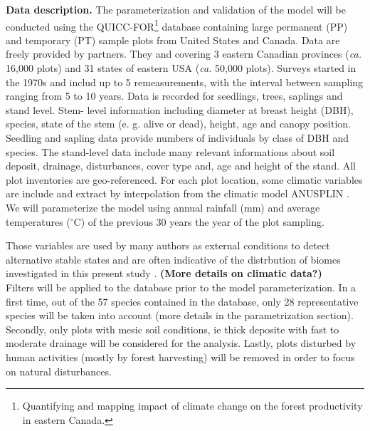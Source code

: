 \textbf{Data description.} The parameterization and validation of the model
will be conducted using the QUICC-FOR\footnote{Quantifying and mapping impact
of climate change on the forest productivity in eastern Canada.} database
containing large permanent (PP) and temporary (PT) sample plots from
United States and Canada. Data are freely provided by partners. They and
covering 3 eastern Canadian provinces (\textit{ca.} 16,000 plots) and 31 states of
eastern USA (\textit{ca.} 50,000 plots). Surveys started in the 1970s and includ up to
5 remeasurements, with the interval between sampling ranging from 5 to 10
years. Data is recorded for seedlings, trees, saplings and stand level. Stem-
level information including diameter at breast height (DBH), species, state of
the stem (e. g. alive or dead), height, age and canopy position. Seedling and
sapling data provide numbers of individuals by class of DBH and species. The
stand-level data include many relevant informations about soil deposit,
drainage, disturbances, cover type and, age and height of the stand. All plot
inventories are geo-referenced. For each plot location, some climatic
variables are include and extract by interpolation from the climatic model
ANUSPLIN \cite{McKenney2011}. We will parameterize the model using annual
rainfall (mm) and average temperatures (\ensuremath{^\circ}C) of the previous
30 years the year of the plot sampling. 


Those variables are used by many
authors as external conditions to detect alternative stable states and are
often indicative of the distrbution of biomes investigated in this present
study \cite{Goldblum2010,Hirota2011,Scheffer2012}. \textbf{(More details on
climatic data?)}\\


Filters will be applied to the database prior to the model parameterization.
In a first time, out of the 57 species contained in the  database, only 28
representative species will be taken into account (more details in the
parametrization section). Secondly,  only plots with mesic soil conditions, ie
thick deposite with fast to moderate drainage will be considered for the
analysis. Lastly, plots disturbed by human activities (mostly by forest
harvesting) will be removed in order to focus on natural disturbances. \\ 

